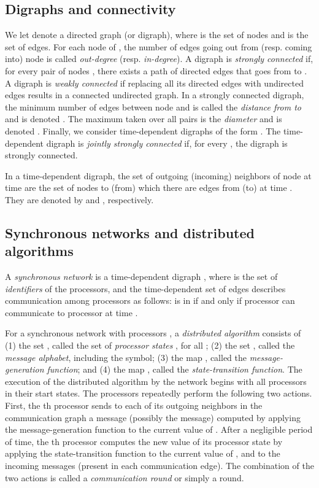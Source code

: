 \documentclass[onecolumn,journal,letterpaper]{IEEEtran}
\begin{document}
\subsection{Digraphs and connectivity}
We let  denote a directed graph (or digraph), where
 is the set of nodes and  is the set of
edges.  For each node  of , the number of edges going out from
(resp. coming into) node  is called \emph{out-degree}
(resp. \emph{in-degree}).
A digraph is \emph{strongly connected} if, for every pair of nodes , there exists a path of directed edges that
goes from  to . A digraph is \emph{weakly connected} if replacing all
its directed edges with undirected edges results in a connected undirected
graph. In a strongly connected digraph, the minimum number of edges between
node  and  is called the \emph{distance from  to } and is
denoted . The maximum  taken over all pairs 
is the \emph{diameter} and is denoted .  Finally, we consider
time-dependent digraphs of the form . The time-dependent digraph  is \emph{jointly strongly
  connected} if, for every , the digraph
 is strongly connected.

In a time-dependent digraph, the set of outgoing (incoming) neighbors of
node  at time  are the set of nodes to (from) which there are edges
from (to)  at time . They are denoted by  and
, respectively.


\subsection{Synchronous networks and distributed algorithms}
\label{subsec:networkmodel+distributedalgos}
A \emph{synchronous network} is a time-dependent digraph , where  is the set of \emph{identifiers} of
the processors, and the time-dependent set of edges 
describes communication among processors as follows:  is in
 if and only if processor  can communicate to
processor  at time .


For a synchronous network  with processors , a
\emph{distributed algorithm} consists of (1) the set , called the set of
\emph{processor states} , for all ; (2) the
set , called the \emph{message alphabet}, including the 
symbol; (3) the map , called the
\emph{message-generation function}; and (4) the map , called the \emph{state-transition function}.
The execution of the distributed algorithm by the network begins with all
processors in their start states.  The processors repeatedly perform the
following two actions. First, the th processor sends to each of its
outgoing neighbors in the communication graph a message (possibly the
 message) computed by applying the message-generation function to the
current value of .  After a negligible period of time, the
th processor computes the new value of its processor state
 by applying the state-transition function to the current
value of , and to the incoming messages (present in each
communication edge). The combination of the two actions is called a
\emph{communication round} or simply a round.
\end{document}
